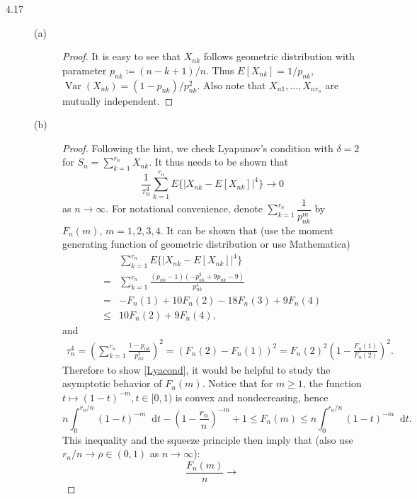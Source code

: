 \documentclass{article}
\newcommand{\dd}{\mathop{}\!\mathrm{d}}
\DeclareMathOperator*{\Var}{Var}
\theoremstyle{definition}
\theoremstyle{plain}
\theoremstyle{remark}
\begin{document}
\begin{description}
\item[4.17]
\begin{description}
\item[(a)]
\begin{proof}
It is easy to see that $X_{nk}$ follows geometric distribution with parameter $p_{nk} \coloneqq (n - k + 1)/n$. Thus $E[X_{nk}] = 1/p_{nk}$, $\Var(X_{nk}) = (1 - p_{nk})/p_{nk}^2$. Also note that 
$X_{n1}, \ldots, X_{nr_n}$ are mutually independent. 
\end{proof}

\item[(b)]
\begin{proof}
Following the hint, we check Lyapunov's condition with $\delta = 2$ for $S_n = 
\sum\limits_{k = 1}^{r_n} X_{nk}$. It thus needs to be shown that
\begin{equation}\label{Lyacond}
\frac{1}{\tau_n^4} \sum_{k = 1}^{r_n} E\{|X_{nk} - E[X_{nk}]|^4\} \to 0
\end{equation}
as $n \to \infty$. For notational convenience, denote $\sum\limits_{k = 1}^{r_n} \dfrac{1}{p_{nk}^m}$ by $F_n(m)$, $m = 1, 2, 3, 4$. It can be shown that (use the moment generating function of geometric distribution
or use Mathematica)
\begin{align*}
& \sum_{k = 1}^{r_n} E\{|X_{nk} - E[X_{nk}]|^4\} \\
= & \sum_{k = 1}^{r_n} \frac{(p_{nk} - 1)(-p_{nk}^2 + 9p_{nk} - 9)}{p_{nk}^4} \\
= & -F_n(1) + 10F_n(2) - 18F_n(3) + 9F_n(4) \\
\leq & 10F_n(2) + 9F_n(4),
\end{align*}
and
\begin{align*}
\tau_n^4 = \left(\sum_{k = 1}^{r_n}\frac{1 - p_{nk}}{p_{nk}^2}\right)^2 = (F_n(2) - F_n(1))^2 = F_n(2)^2 \left(1 - \frac{F_n(1)}{F_n(2)}\right)^2.
\end{align*}
Therefore to show \eqref{Lyacond}, it would be helpful to study the asymptotic behavior of $F_n(m)$. Notice that for $m \geq 1$, the function $t \mapsto (1 - t)^{-m}, t \in [0, 1)$ is convex and nondecreasing, hence
\begin{equation*}
n\int_0^{r_n/n} (1 - t)^{-m} \dd t  
- \left(1 - \frac{r_n}{n}\right)^{-m} + 1 \leq F_n(m) \leq n \int_0^{r_n / n} (1 - t)^{-m} \dd t.
\end{equation*}
This inequality and the squeeze principle then imply that (also use $r_n/n \to \rho \in (0, 1)$ as $n \to \infty$):
\begin{equation}\label{bound}
\frac{F_n(m)}{n} \to 

\end{equation}
\end{proof}
\end{description}
\end{description}
\end{document}
